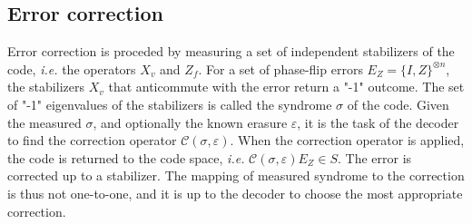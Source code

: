 \subsection{Error correction}
Error correction is proceded by measuring a set of independent stabilizers of the code, \emph{i.e.} the operators $X_v$ and $Z_f$. For a set of phase-flip errors $E_Z = \{I,Z\}^{\otimes n}$, the stabilizers $X_v$ that anticommute with the error return a "-1" outcome. The set of "-1" eigenvalues of the stabilizers is called the syndrome $\sigma$ of the code. Given the measured $\sigma$, and optionally the known erasure $\varepsilon$, it is the task of the decoder to find the correction operator $\mathcal{C}(\sigma, \varepsilon)$. When the correction operator is applied, the code is returned to the code space, \emph{i.e.} $\mathcal{C}(\sigma, \varepsilon)E_Z \in S$. The error is corrected up to a stabilizer. The mapping of measured syndrome to the correction is thus not one-to-one, and it is up to the decoder to choose the most appropriate correction. 